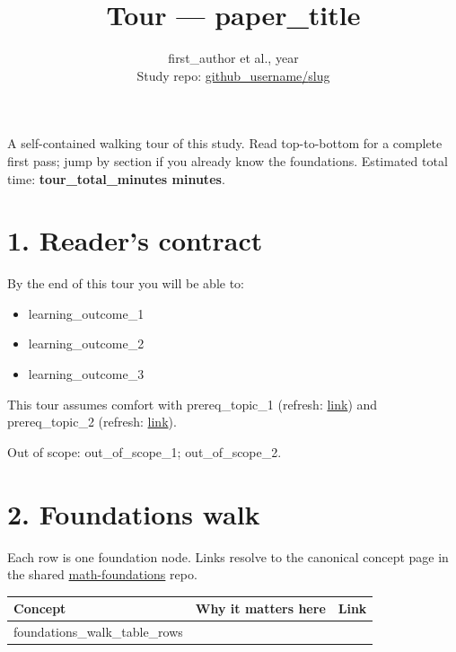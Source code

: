 \documentclass[11pt]{article}
\title{Tour --- {{paper_title}}}
\author{ {{first_author}} et al., {{year}} \\ \small Study repo: \href{ {{repo_url}} }{ {{github_username}}/{{slug}} } }
\date{}
\begin{document}
\maketitle

\noindent
A self-contained walking tour of this study. Read top-to-bottom for a complete first pass; jump by section if you already know the foundations. Estimated total time: \textbf{ {{tour_total_minutes}} minutes}.

\section*{1. Reader's contract}

By the end of this tour you will be able to:
\begin{itemize}[leftmargin=*]
  \item {{learning_outcome_1}}
  \item {{learning_outcome_2}}
  \item {{learning_outcome_3}}
\end{itemize}

\noindent
This tour assumes comfort with {{prereq_topic_1}} (refresh: \href{ {{prereq_link_1}} }{link}) and {{prereq_topic_2}} (refresh: \href{ {{prereq_link_2}} }{link}).

\noindent
Out of scope: {{out_of_scope_1}}; {{out_of_scope_2}}.

\section*{2. Foundations walk}

Each row is one foundation node. Links resolve to the canonical concept page in the shared \href{https://github.com/pleyva2004/math-foundations}{math-foundations} repo.

\begin{longtable}{p{} p{} p{}}
\toprule
\textbf{Concept} & \textbf{Why it matters here} & \textbf{Link} \\
\midrule
\endhead
\bottomrule
\endfoot
{{foundations_walk_table_rows}} \\
\end{longtable}
\end{document}
